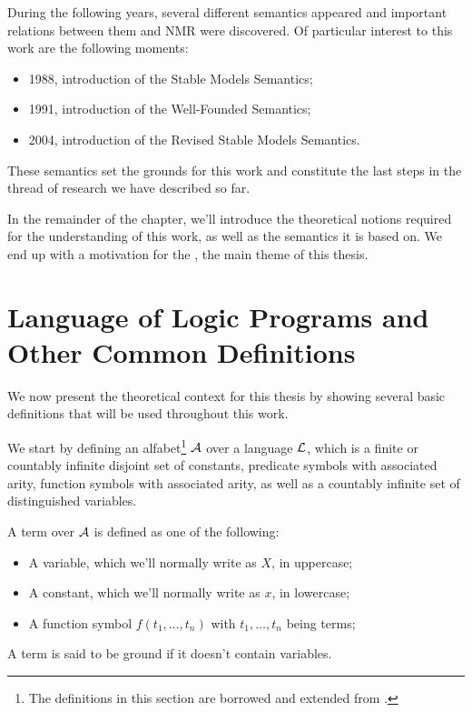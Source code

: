 During the following years, several different semantics appeared and important relations between them and NMR were discovered. Of particular interest to this work are the following moments:

\begin{itemize}
	\item 1988, introduction of the Stable Models Semantics\cite{smMain};
	\item 1991, introduction of the Well-Founded Semantics\cite{wfsMain};
	\item 2004, introduction of the Revised Stable Models Semantics\cite{ampMSc, rsmEpia}.
\end{itemize}

These semantics set the grounds for this work and constitute the last steps in the thread of research we have described so far.

In the remainder of the chapter, we'll introduce the theoretical notions required for the understanding of this work, as well as the semantics it is based on. We end up with a motivation for the \rwfs, the main theme of this thesis.


\section{Language of Logic Programs and Other Common Definitions}
We now present the theoretical context for this thesis by showing several basic definitions that will be used throughout this work.

We start by defining an alfabet\footnote{The definitions in this section are borrowed and extended from \cite{aparasPhD,jjaPhD,milkBook}.} $\cal{A}$ over a language $\cal{L}$, which is a finite or countably infinite disjoint set of constants, predicate symbols with associated arity, function symbols with associated arity, as well as a countably infinite set of distinguished variables.


\begin{definition}[Term]
A term over $\cal{A}$ is defined as one of the following:
\begin{itemize}
	\item A variable, which we'll normally write as $X$, in uppercase;
	\item A constant, which we'll normally write as $x$, in lowercase;
	\item A function symbol $f(t_{1},\ldots,t_{n})$ with $t_{1},\ldots,t_{n}$ being terms;
\end{itemize}
A term is said to be ground if it doesn't contain variables.
\end{definition}

